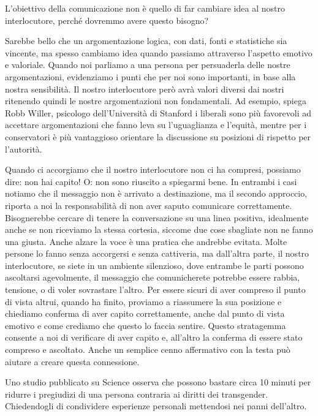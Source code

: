 \documentclass[12pt]{book} %
\begin{document}
L'obiettivo della comunicazione non è quello di far cambiare idea al nostro interlocutore, perché dovremmo avere questo bisogno?

Sarebbe bello che un argomentazione logica, con dati, fonti e statistiche sia vincente, ma
spesso cambiamo idea quando passiamo attraverso l'aspetto emotivo e valoriale. Quando
noi parliamo a una persona per persuaderla delle nostre argomentazioni, evidenziamo i punti che per noi sono
importanti, in base alla nostra sensibilità. Il nostro interlocutore però avrà valori diversi dai nostri ritenendo
quindi le nostre argomentazioni non fondamentali.
Ad esempio, spiega Robb Willer, psicologo dell'Università di Stanford i liberali sono più favorevoli ad accettare argomentazioni
che fanno leva su l'uguaglianza e l'equità, mentre per i conservatori è più vantaggioso orientare la discussione su
posizioni di rispetto per l'autorità.

Quando ci accorgiamo che il nostro interlocutore non ci ha
compresi, possiamo dire: non hai capito! O: non sono riuscito a spiegarmi bene. In entrambi i casi notiamo che il
messaggio non è arrivato a destinazione, ma il secondo approccio, riporta a noi la responsabilità di non aver saputo
comunicare correttamente. Bisognerebbe cercare di tenere la conversazione su una linea positiva, idealmente anche se non riceviamo la stessa cortesia, siccome due cose sbagliate non ne fanno una giusta. Anche alzare la voce è una pratica che andrebbe evitata. Molte persone lo fanno
senza accorgersi e senza cattiveria, ma dall'altra parte, il nostro interlocutore, se siete in un
ambiente silenzioso, dove entrambe le parti possono ascoltarsi agevolmente, il messaggio che comunicherete potrebbe essere rabbia, tensione, o di voler sovrastare l'altro. Per essere sicuri di aver compreso il punto di vista altrui, quando ha finito, proviamo a
riassumere la sua posizione e chiediamo conferma di aver capito correttamente, anche dal punto di vista emotivo e come crediamo che questo lo faccia sentire. Questo stratagemma consente a noi di verificare di aver capito e, all'altro la conferma di
essere stato compreso e ascoltato. Anche un semplice cenno affermativo con la testa può aiutare a creare questa connessione. 

Uno studio pubblicato su Science osserva che
possono bastare circa 10 minuti per ridurre i pregiudizi di una persona contraria ai diritti dei transgender. Chiedendogli di condividere esperienze personali mettendosi nei panni dell’altro.
\end{document}
